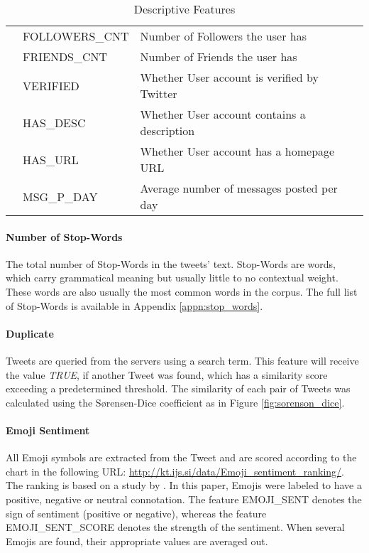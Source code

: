 \begin{table}[h]
\begin{center}
{\begin{tabular}{c |l| l}
							& FOLLOWERS\_CNT 			& Number of Followers the user has	\\
							& FRIENDS\_CNT				& Number of Friends the user has	\\
							& VERIFIED					& Whether User account is verified by Twitter\\
							& HAS\_DESC 				& Whether User account contains a description\\
							& HAS\_URL					& Whether User account has a homepage URL	\\
							& MSG\_P\_DAY 				& Average number of messages posted per day	\\
					\hline\hline
				\end{tabular}
				}	
				\end{center}
				\caption{Descriptive Features}
				\label{table:desc_features}
			\end{table}
		
		
			\paragraph{Number of Stop-Words}
				The total number of Stop-Words in the tweets' text. Stop-Words are words, which carry grammatical meaning but usually little to no contextual weight. These words are also usually the most common words in the corpus. The full list of Stop-Words is available in Appendix \ref{appn:stop_words}.
				
			\paragraph{Duplicate}	
				Tweets are queried from the servers using a search term. This feature will receive the value \textit{TRUE}, if another Tweet was found, which has a similarity score exceeding a predetermined threshold. The similarity of each pair of Tweets was calculated using the S\o rensen-Dice coefficient as in Figure \ref{fig:sorenson_dice}.
			
			\paragraph{Emoji Sentiment}
				All Emoji symbols are extracted from the Tweet and are scored according to the chart in the following URL: \url{http://kt.ijs.si/data/Emoji_sentiment_ranking/}. The ranking is based on a study by \cite{Kralj2015emojis}. In this paper, Emojis were labeled to have a positive, negative or neutral connotation. The feature EMOJI\_SENT denotes the sign of sentiment (positive or negative), whereas the feature EMOJI\_SENT\_SCORE denotes the strength of the sentiment. When several Emojis are found, their appropriate values are averaged out. 
				
